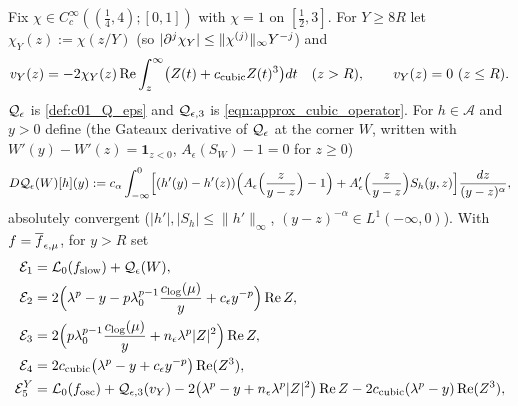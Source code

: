 \begin{definition}
  \label{def:residual_decomposition}
  Fix $\chi\in C_c^\infty((\frac14,4);[0,1])$ with $\chi=1$ on $[\frac12,3]$. For $Y\ge8R$ let $\chi_Y(z):=\chi(z/Y)$ (so
  $|\partial^j\chi_Y|\le\|\chi^{(j)}\|_\infty Y^{-j}$) and
  \begin{equation}\label{eqn:approx_local_oscillatory_front}
    v_Y(z)=-2\chi_Y(z)\operatorname{Re}\int_z^\infty\bigl(Z(t)+c_{\textup{cubic}}Z(t)^3\bigr)dt\quad(z>R),\qquad v_Y(z)=0\ (z\le R).
  \end{equation}
  $\mathcal{Q}_\epsilon$ is \cref{def:c01_Q_eps} and $\mathcal{Q}_{\epsilon,3}$ is \eqref{eqn:approx_cubic_operator}. For $h\in\mathcal A$ and $y>0$ define
  (the Gateaux derivative of $\mathcal{Q}_\epsilon$ at the corner $W$, written with $W'(y)-W'(z)=\mathbf 1_{z<0}$, $A_\epsilon(S_W)-1=0$ for $z\ge0$)
  \[
    D\mathcal{Q}_\epsilon(W)[h](y):=c_\alpha\int_{-\infty}^0\Bigl[(h'(y)-h'(z))\Bigl(A_\epsilon\Bigl(\frac z{y-z}\Bigr)-1\Bigr)+A_\epsilon'\Bigl(\frac z{y-z}\Bigr)S_h(y,z)\Bigr]\frac{dz}{(y-z)^\alpha},
  \]
  absolutely convergent ($|h'|,|S_h|\le\|h'\|_\infty$, $(y-z)^{-\alpha}\in L^1(-\infty,0)$). With $f=\overline{f}_{\epsilon,\mu}$, for $y>R$ set
  \begin{align}
    \mc E_1&=\mc L_0(f_{\textup{slow}})+\mc Q_\epsilon(W),\label{eqn:approx_E1}\\
    \mc E_2&=2\Bigl(\lambda^p-y-p\lambda_0^{p-1}\frac{c_{\textup{log}}(\mu)}y+c_\epsilon y^{-p}\Bigr)\operatorname{Re}Z,\label{eqn:approx_E2}\\
    \mc E_3&=2\Bigl(p\lambda_0^{p-1}\frac{c_{\textup{log}}(\mu)}y+n_\epsilon\lambda^p|Z|^2\Bigr)\operatorname{Re}Z,\label{eqn:approx_E3}\\
    \mc E_4&=2c_{\textup{cubic}}\bigl(\lambda^p-y+c_\epsilon y^{-p}\bigr)\operatorname{Re}(Z^3),\label{eqn:approx_E4}\\
    \mc E_5^{Y}&=\mc L_0(f_{\textup{osc}})+\mc Q_{\epsilon,3}(v_Y)-2\bigl(\lambda^p-y+n_\epsilon\lambda^p|Z|^2\bigr)\operatorname{Re}Z-2c_{\textup{cubic}}(\lambda^p-y)\operatorname{Re}(Z^3),\label{eqn:approx_E5}\\

\end{align}
\end{definition}
